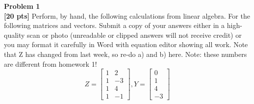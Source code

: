 \documentclass{article}
\newenvironment{problem}[2][Problem]
    { \begin{mdframed}[backgroundcolor=gray!20] \textbf{#1 #2} \\}
    {  \end{mdframed}}
\begin{document}
\begin{problem}{1}
\textbf{[20 pts]}
Perform, by hand, the following calculations from linear algebra. For the following matrices and vectors. Submit a copy of your answers either in a high-quality scan or photo (unreadable or clipped answers will not receive credit) or you may format it carefully in Word with equation editor showing all work. Note that Z has changed from last week, so re-do a) and b) here. Note: these numbers are different from homework 1!
\begin{equation}
Z = 
\begin{bmatrix}
1 & 2 \\
1 & -3 \\
1 & 4 \\
1 & -1
\end{bmatrix}, 
Y = 
\begin{bmatrix}
0 \\
1 \\
4 \\
-3
\end{bmatrix}
\end{equation}
\end{problem}
\end{document}
